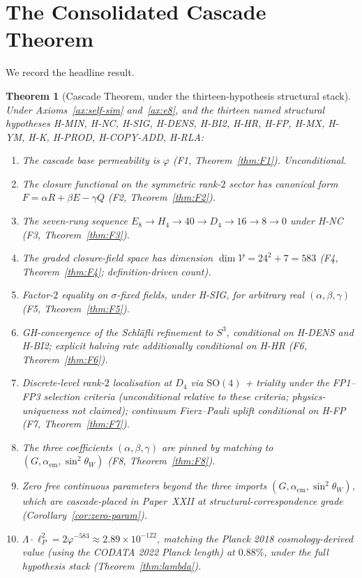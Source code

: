 \documentclass[12pt]{article}
\newtheorem{theorem}{Theorem}
\theoremstyle{definition}
\theoremstyle{remark}
\newcommand{\Vcal}{\mathcal{V}}
\begin{document}
\section{The Consolidated Cascade Theorem}\label{sec:consolidated}

We record the headline result.

\begin{theorem}[Cascade Theorem, under the thirteen-hypothesis structural stack]\label{thm:cascade}
Under Axioms~\ref{ax:self-sim} and~\ref{ax:e8}, and the thirteen named structural hypotheses H-MIN, H-NC, H-SIG, H-DENS, H-BI2, H-HR, H-FP, H-MX, H-YM, H-K, H-PROD, H-COPY-ADD, H-RLA:
\begin{enumerate}
\item[\textup{(1)}] The cascade base permeability is $\varphi$ (F1, Theorem~\ref{thm:F1}). \emph{Unconditional.}
\item[\textup{(2)}] The closure functional on the symmetric rank-$2$ sector has canonical form $F = \alpha R + \beta E - \gamma Q$ (F2, Theorem~\ref{thm:F2}).
\item[\textup{(3)}] The seven-rung sequence $E_8 \to H_4 \to 40 \to D_4 \to 16 \to 8 \to 0$ under H-NC (F3, Theorem~\ref{thm:F3}).
\item[\textup{(4)}] The graded closure-field space has dimension $\dim \Vcal = 24^2 + 7 = 583$ (F4, Theorem~\ref{thm:F4}; definition-driven count).
\item[\textup{(5)}] Factor-$2$ equality on $\sigma$-fixed fields, under H-SIG, for arbitrary real $(\alpha, \beta, \gamma)$ (F5, Theorem~\ref{thm:F5}).
\item[\textup{(6)}] GH-convergence of the Schl\"afli refinement to $S^3$, conditional on H-DENS and H-BI2; explicit halving rate additionally conditional on H-HR (F6, Theorem~\ref{thm:F6}).
\item[\textup{(7)}] Discrete-level rank-$2$ localisation at $D_4$ via $\mathrm{SO}(4)$ + triality under the FP1--FP3 selection criteria (unconditional relative to these criteria; physics-uniqueness not claimed); continuum Fierz--Pauli uplift conditional on H-FP (F7, Theorem~\ref{thm:F7}).
\item[\textup{(8)}] The three coefficients $(\alpha, \beta, \gamma)$ are pinned by matching to $(G, \alpha_{\mathrm{em}}, \sin^2\theta_W)$ (F8, Theorem~\ref{thm:F8}).
\item[\textup{(9)}] Zero free continuous parameters beyond the three imports $(G, \alpha_{\mathrm{em}}, \sin^2\theta_W)$, which are cascade-placed in Paper~XXII at structural-correspondence grade (Corollary~\ref{cor:zero-param}).
\item[\textup{(10)}] $\Lambda \cdot \ell_P^2 = 2 \varphi^{-583} \approx 2.89 \times 10^{-122}$, matching the Planck 2018 cosmology-derived value (using the CODATA 2022 Planck length) at $0.88\%$, under the full hypothesis stack (Theorem~\ref{thm:lambda}).
\end{enumerate}
\end{theorem}
\end{document}
